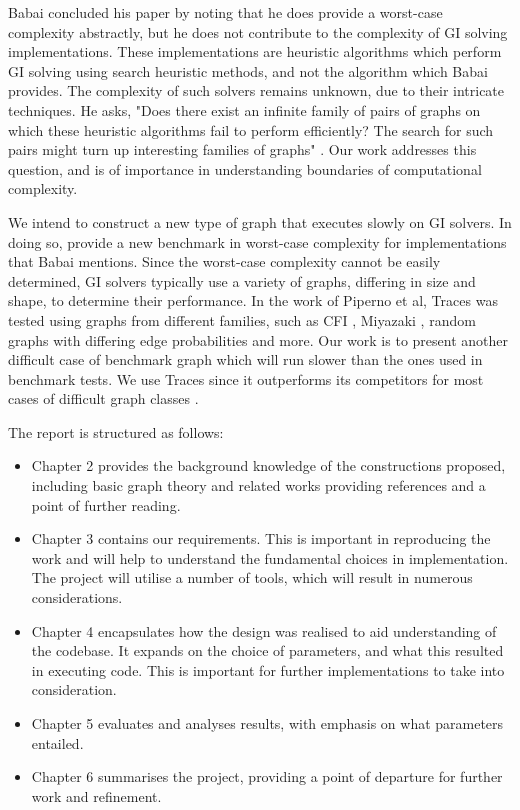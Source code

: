 \newpage
Babai concluded his paper by noting that he does provide a worst-case complexity abstractly, but he does not contribute to the complexity of GI solving implementations. These implementations are heuristic algorithms which perform GI solving using search heuristic methods, and not the algorithm which Babai provides. The complexity of such solvers remains unknown, due to their intricate techniques. He asks, "Does there exist an infinite family of pairs of graphs on which these heuristic algorithms fail to perform efficiently? The search for such pairs might turn up interesting families of graphs" \cite{babai2016graph}. Our work addresses this question, and is of importance in understanding boundaries of computational complexity. 
\par
We intend to construct a new type of graph that executes slowly on GI solvers. In doing so, provide a new benchmark in worst-case complexity for implementations that Babai mentions. Since the worst-case complexity cannot be easily determined, GI solvers typically use a variety of graphs, differing in size and shape, to determine their performance. In the work of Piperno et al, Traces was tested using graphs from different families, such as CFI \cite{cai1992optimal}, Miyazaki \cite{miyazaki1997complexity}, random graphs with differing edge probabilities and more. Our work is to present another difficult case of benchmark graph which will run slower than the ones used in benchmark tests. We use Traces since it outperforms its competitors for most cases of difficult graph classes \cite{mckay2014practical}. 
\par
The report is structured as follows:
\begin{itemize}
	\item Chapter 2 provides the background knowledge of the constructions proposed, including basic graph theory and related works providing references and a point of further reading.
	\item Chapter 3 contains our requirements. This is important in reproducing the work and will help to understand the fundamental choices in implementation.  The project will utilise a number of tools, which will result in numerous considerations. 
	\item Chapter 4 encapsulates how the design was realised to aid understanding of the codebase. It expands on the choice of parameters, and what this resulted in executing code. This is important for further implementations to take into consideration. 
	\item Chapter 5 evaluates and analyses results, with emphasis on what parameters entailed. 
	\item Chapter 6 summarises the project, providing a point of departure for further work and refinement.
\end{itemize}





